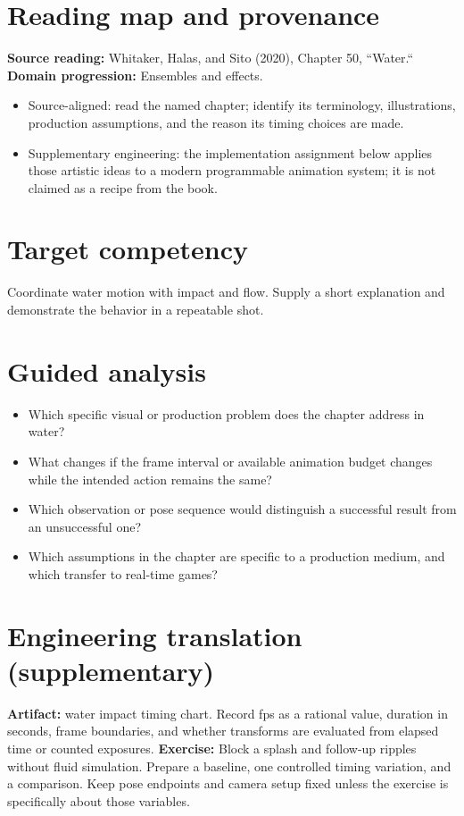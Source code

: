 \documentclass[10pt,letterpaper]{article}
\begin{document}
\makedoctitle
\makedocsummary

\section{Reading map and provenance}
\textbf{Source reading:} Whitaker, Halas, and Sito (2020), Chapter 50, ``Water.``\\
\textbf{Domain progression:} Ensembles and effects.
\begin{itemize}
\item Source-aligned: read the named chapter; identify its terminology, illustrations, production assumptions, and the reason its timing choices are made.
\item Supplementary engineering: the implementation assignment below applies those artistic ideas to a modern programmable animation system; it is not claimed as a recipe from the book.
\end{itemize}
\section{Target competency}
Coordinate water motion with impact and flow. Supply a short explanation and demonstrate the behavior in a repeatable shot.
\section{Guided analysis}
\begin{itemize}
\item Which specific visual or production problem does the chapter address in water?
\item What changes if the frame interval or available animation budget changes while the intended action remains the same?
\item Which observation or pose sequence would distinguish a successful result from an unsuccessful one?
\item Which assumptions in the chapter are specific to a production medium, and which transfer to real-time games?
\end{itemize}
\section{Engineering translation (supplementary)}
\textbf{Artifact:} water impact timing chart. Record fps as a rational value, duration in seconds, frame boundaries, and whether transforms are evaluated from elapsed time or counted exposures.
\textbf{Exercise:} Block a splash and follow-up ripples without fluid simulation. Prepare a baseline, one controlled timing variation, and a comparison. Keep pose endpoints and camera setup fixed unless the exercise is specifically about those variables.
\end{document}
